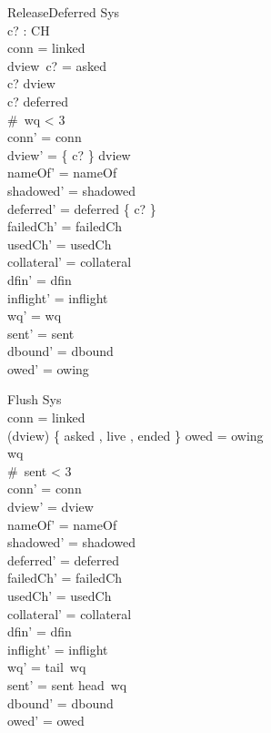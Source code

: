 \documentclass[a4paper,10pt,fleqn]{article}
\begin{document}
\begin{schema}{ReleaseDeferred}
  \Delta Sys \\
  c? : CH \\
\where
  conn = linked \\
  dview~c? = asked \\
  c? \in \dom dview \\
  c? \in deferred \\
  \#~wq < 3 \\
  conn' = conn \\
  dview' = \{ c? \} \ndres dview \\
  nameOf' = nameOf \\
  shadowed' = shadowed \\
  deferred' = deferred \setminus \{ c? \} \\
  failedCh' = failedCh \\
  usedCh' = usedCh \\
  collateral' = collateral \\
  dfin' = dfin \\
  inflight' = inflight \\
  wq' = wq \\
  sent' = sent \\
  dbound' = dbound \\
  owed' = owing
\end{schema}

\begin{schema}{Flush}
  \Delta Sys \\
\where
  conn = linked \\
  (\ran dview) \cap \{ asked , live , ended \} \neq \emptyset \lor owed = owing \\
  wq \neq \langle \rangle \\
  \#~sent < 3 \\
  conn' = conn \\
  dview' = dview \\
  nameOf' = nameOf \\
  shadowed' = shadowed \\
  deferred' = deferred \\
  failedCh' = failedCh \\
  usedCh' = usedCh \\
  collateral' = collateral \\
  dfin' = dfin \\
  inflight' = inflight \\
  wq' = tail~wq \\
  sent' = sent \cat \langle head~wq \rangle \\
  dbound' = dbound \\
  owed' = owed
\end{schema}
\end{document}
